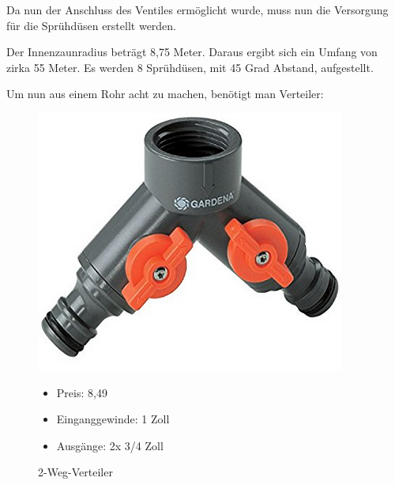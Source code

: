 Da nun der Anschluss des Ventiles ermöglicht wurde, muss nun die Versorgung für die Sprühdüsen erstellt werden. 

Der Innenzaunradius beträgt 8,75 Meter. Daraus ergibt sich ein Umfang von zirka 55 Meter. Es werden 8 Sprühdüsen, mit 45 Grad Abstand, aufgestellt. 

Um nun aus einem Rohr acht zu machen, benötigt man Verteiler:

\begin{figure}[!ht]
\begin{minipage}[t]{0.45\textwidth}
\includegraphics[width=\textwidth]{Gardena2Weg}
\caption{2-Weg-Verteiler}

\begin{itemize}
	\item{Preis: 8,49\textsf{\texteuro}}
	\item{Einganggewinde: 1 Zoll}
	\item{Ausgänge: 2x 3/4 Zoll}
\end{itemize}

\end{minipage}
\hspace{0.1\textwidth}
\begin{minipage}[t]{0.45\textwidth}


\end{minipage}
\end{figure}
